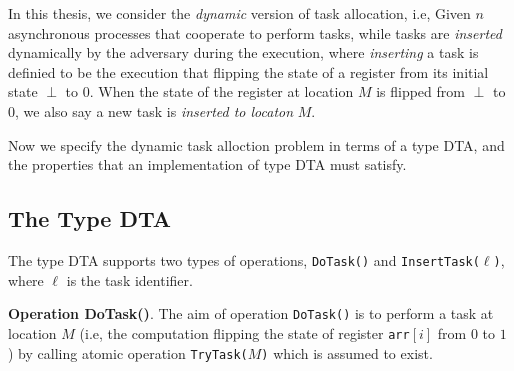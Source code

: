 In this thesis, we consider the \emph{dynamic} version of task allocation, i.e, Given $n$
asynchronous processes that cooperate to perform tasks, while tasks are \emph{inserted}
dynamically by the adversary during the execution, where \emph{inserting} a task is definied to be
the execution that flipping the state of a register from its initial state $\perp$ to $0$.
When the state of the register at location $M$ is flipped from $\perp$ to $0$, we also say a new task is \emph{inserted to locaton} $M$.

Now we specify the dynamic task alloction problem in terms of a type DTA, and the properties
that an implementation of type DTA must satisfy.

%



\subsection{The Type DTA}

The type DTA supports two types of operations, \texttt{DoTask()} and
\texttt{InsertTask(}$\ell$\texttt{)}, where $\ell$ is the task identifier.

\textbf{Operation DoTask()}.
The aim of operation \texttt{DoTask()} is to perform a task at location $M$ (i.e, the computation flipping the state of register \texttt{arr}$[i]$ from $0$ to $1$) by calling
atomic operation \texttt{TryTask(}$M$\texttt{)} which is assumed to exist.

